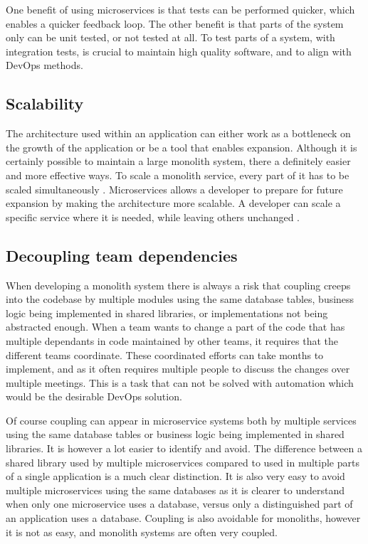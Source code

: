 \documentclass{article}
\begin{document}
One benefit of using microservices is that tests can be performed quicker, which enables a quicker feedback loop. The other benefit is that parts of the system only can be unit tested, or not tested at all. To test parts of a system, with integration tests, is crucial to maintain high quality software, and to align with DevOps methods.

\subsection{Scalability}
The architecture used within an application can either work as a bottleneck on the growth of the application or be a tool that enables expansion. Although it is certainly possible to maintain a large monolith system, there a definitely easier and more effective ways. To scale a monolith service, every part of it has to be scaled simultaneously \cite{Newman2015}. Microservices allows a developer to prepare for future expansion by making the architecture more scalable. A developer can scale a specific service where it is needed, while leaving others unchanged \cite{Newman2015}.

\subsection{Decoupling team dependencies}
When developing a monolith system there is always a risk that coupling creeps into the codebase by multiple modules using the same database tables, business logic being implemented in shared libraries, or implementations not being abstracted enough. When a team wants to change a part of the code that has multiple dependants in code maintained by other teams, it requires that the different teams coordinate. These coordinated efforts can take months to implement, and as it often requires multiple people to discuss the changes over multiple meetings. This is a task that can not be solved with automation which would be the desirable DevOps solution.

Of course coupling can appear in microservice systems both by multiple services using the same database tables or business logic being implemented in shared libraries. It is however a lot easier to identify and avoid. The difference between a shared library used by multiple microservices compared to used in multiple parts of a single application is a much clear distinction. It is also very easy to avoid multiple microservices using the same databases as it is clearer to understand when only one microservice uses a database, versus only a distinguished part of an application uses a database. Coupling is also avoidable for monoliths, however it is not as easy, and monolith systems are often very coupled.
\end{document}
